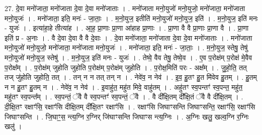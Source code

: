 \documentclass[17pt]{extarticle}
\begin{document}
27. दे॒वा मनो॑जाता॒ मनो॑जाता दे॒वा दे॒वा मनो॑जाताः । . मनो॑जाता मनो॒युजो॑ मनो॒युजो॒ मनो॑जाता॒ मनो॑जाता मनो॒युजः॑ । . मनो॑जाता॒ इति॒ मनः॑ - जा॒ताः॒ । . म॒नो॒युज॒ इतीति॑ मनो॒युजो॑ मनो॒युज॒ इति॑ । . म॒नो॒युज॒ इति॑ मनः - युजः॑ । . इत्या॑हा॒हे तीत्या॑ह । . आ॒ह॒ प्रा॒णाः प्रा॒णा आ॑हाह प्रा॒णाः । . प्रा॒णा वै वै प्रा॒णाः प्रा॒णा वै । . प्रा॒णा इति॑ प्र - अ॒नाः । . वै दे॒वा दे॒वा वै वै दे॒वाः । . दे॒वा मनो॑जाता॒ मनो॑जाता दे॒वा दे॒वा मनो॑जाताः । . मनो॑जाता मनो॒युजो॑ मनो॒युजो॒ मनो॑जाता॒ मनो॑जाता मनो॒युजः॑ । . मनो॑जाता॒ इति॒ मनः॑ - जा॒ताः॒ । . म॒नो॒युज॒ स्तेषु॒ तेषु॑ मनो॒युजो॑ मनो॒युज॒ स्तेषु॑ । . म॒नो॒युज॒ इति॑ मनः - युजः॑ । . तेष्वे॒ वैव तेषु॒ तेष्वे॒व । . ए॒व प॒रोक्ष॑म् प॒रोक्ष॑ मे॒वैव प॒रोक्ष᳚म् । . प॒रोक्ष॑म् जुहोति जुहोति प॒रोक्ष॑म् प॒रोक्ष॑म् जुहोति । . प॒रोक्ष॒मिति॑ परः - अक्ष᳚म् । . जु॒हो॒ति॒ तत् तज् जु॑होति जुहोति॒ तत् । . तन् न न तत् तन् न । . नेवे॑व॒ न नेव॑ । . इ॒व॒ हु॒तꣳ हु॒त मि॑वेव हु॒तम् । . हु॒तम् न न हु॒तꣳ हु॒तम् न । . नेवे॑व॒ न नेव॑ । . इ॒वाहु॑त॒ महु॑त मिवे॒ वाहु॑तम् । . अहु॑तꣳ स्व॒पन्तꣳ॑ स्व॒पन्त॒ महु॑त॒ महु॑तꣳ स्व॒पन्त᳚म् । . स्व॒पन्तं॒ ॅवै वै स्व॒पन्तꣳ॑ स्व॒पन्तं॒ ॅवै । . वै दी᳚क्षि॒तम् दी᳚क्षि॒तं ॅवै वै दी᳚क्षि॒तम् । . दी॒क्षि॒तꣳ रक्षाꣳ॑सि॒ रक्षाꣳ॑सि दीक्षि॒तम् दी᳚क्षि॒तꣳ रक्षाꣳ॑सि । . रक्षाꣳ॑सि जिघाꣳसन्ति जिघाꣳसन्ति॒ रक्षाꣳ॑सि॒ रक्षाꣳ॑सि जिघाꣳसन्ति । . जि॒घाꣳ॒॒स॒ न्त्य॒ग्नि र॒ग्निर् जि॑घाꣳसन्ति जिघाꣳस न्त्य॒ग्निः । . अ॒ग्निः खलु॒ खल्व॒ग्नि र॒ग्निः खलु॑ । \newline
\end{document}

